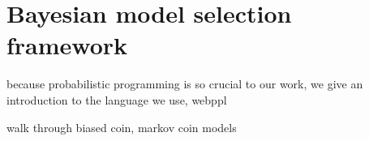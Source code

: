 \documentclass{article}
\newcommand{\cas}[1]{ \textsf{\color{darkgray} \scriptsize #1} }
\begin{document}


\section{Bayesian model selection framework}
\label{s:bayes}

\cas{because probabilistic programming is so crucial to our work, we give an introduction to the language we use, webppl}

\cas{walk through biased coin, markov coin models}
\end{document}
